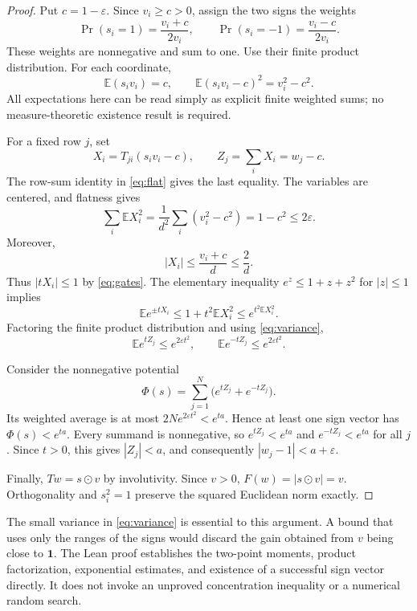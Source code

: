 \documentclass[11pt]{article}
\newcommand{\one}{\mathbf1}
\newcommand{\E}{\mathbb E}
\begin{document}
\begin{proof}
Put $c=1-\varepsilon$. Since $v_i\ge c>0$, assign the two signs the weights
\begin{equation}\label{eq:weights}
\Pr(s_i=1)=\frac{v_i+c}{2v_i},\qquad
\Pr(s_i=-1)=\frac{v_i-c}{2v_i}.
\end{equation}
These weights are nonnegative and sum to one. Use their finite product
distribution. For each coordinate,
\[
\E(s_iv_i)=c,\qquad
\E(s_iv_i-c)^2=v_i^2-c^2.
\]
All expectations here can be read simply as explicit finite weighted sums;
no measure-theoretic existence result is required.

For a fixed row $j$, set
\[
X_i=T_{ji}(s_iv_i-c),\qquad Z_j=\sum_iX_i=w_j-c.
\]
The row-sum identity in \eqref{eq:flat} gives the last equality. The variables
are centered, and flatness gives
\begin{equation}\label{eq:variance}
\sum_i\E X_i^2
=\frac1{d^2}\sum_i(v_i^2-c^2)=1-c^2\le2\varepsilon.
\end{equation}
Moreover,
\[
|X_i|\le\frac{v_i+c}{d}\le\frac2d.
\]
Thus $|tX_i|\le1$ by \eqref{eq:gates}. The elementary inequality
$e^z\le1+z+z^2$ for $|z|\le1$ implies
\[
\E e^{\pm tX_i}\le1+t^2\E X_i^2\le e^{t^2\E X_i^2}.
\]
Factoring the finite product distribution and using \eqref{eq:variance},
\begin{equation}\label{eq:mgf}
\E e^{tZ_j}\le e^{2\varepsilon t^2},\qquad
\E e^{-tZ_j}\le e^{2\varepsilon t^2}.
\end{equation}

Consider the nonnegative potential
\[
\Phi(s)=\sum_{j=1}^N\big(e^{tZ_j}+e^{-tZ_j}\big).
\]
Its weighted average is at most $2Ne^{2\varepsilon t^2}<e^{ta}$.
Hence at least one sign vector has $\Phi(s)<e^{ta}$. Every summand is
nonnegative, so $e^{tZ_j}<e^{ta}$ and $e^{-tZ_j}<e^{ta}$ for all $j$.
Since $t>0$, this gives $|Z_j|<a$, and consequently
$|w_j-1|<a+\varepsilon$.

Finally, $Tw=s\odot v$ by involutivity. Since $v>0$,
$F(w)=|s\odot v|=v$. Orthogonality and $s_i^2=1$ preserve the squared
Euclidean norm exactly.
\end{proof}

The small variance in \eqref{eq:variance} is essential to this argument.
A bound that uses only the ranges of the signs would discard the gain
obtained from $v$ being close to $\one$. The Lean proof establishes the
two-point moments, product factorization, exponential estimates, and
existence of a successful sign vector directly. It does not invoke an
unproved concentration inequality or a numerical random search.
\end{document}
